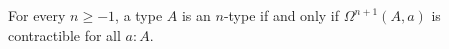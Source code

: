 \documentclass[hott-all.tex]{subfiles}
\begin{document}
% 
% 
% 
\begin{thm}
  For every $n\ge -1$, a type $A$ is an $n$-type if and only if $\Omega^{n+1}(A,a)$ is contractible for all $a:A$.
\end{thm}
% 
% 
\end{document}

